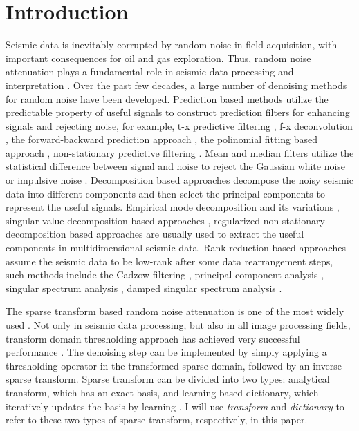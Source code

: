 \section{Introduction}
Seismic data is inevitably corrupted by random noise in field acquisition, with important consequences for oil and gas exploration. Thus, random noise attenuation plays a fundamental role in seismic data processing and interpretation \cite[]{fxydecon,zhuang2015,qushan2015,shuwei2016vscan,huijian20161,huijian20162}. Over the past few decades, a large number of denoising methods for random noise have been developed.  
Prediction based methods utilize the predictable property of useful signals to construct prediction filters for enhancing signals and rejecting noise, for example, t-x predictive filtering \cite[]{abma1995}, f-x deconvolution \cite[]{canales1984}, the forward-backward prediction approach \cite[]{yanghua1999}, the polinomial fitting based approach \cite[]{guochang20112}, non-stationary predictive filtering \cite[]{guochang2012,guochang2013}. Mean and median filters utilize the statistical difference between signal and noise to reject the Gaussian white noise or impulsive noise \cite[]{liuyang2009tvmf,yike2013,shuwei2016}.  Decomposition based approaches decompose the noisy seismic data into different components and then select the principal components to represent the useful signals. Empirical mode decomposition and its variations \cite[]{huangemd}, singular value decomposition based approaches \cite[]{bekara2007,yangkang20141,shuwei2015}, regularized non-stationary decomposition based approaches \cite[]{fomel20132} are usually used to extract the useful components in multidimensional seismic data. Rank-reduction based approaches assume the seismic data to be low-rank after some data rearrangement steps, such methods include the Cadzow filtering \cite[]{trickett2008}, principal component analysis \cite[]{weilin2016seg2}, singular spectrum analysis \cite[]{mssa,weilin2017}, damped  singular spectrum analysis \cite[]{weilin2016,zhangdong2016,yangkang2016irr3d,yangkang2016irr5d}. 

The sparse transform based random noise attenuation is one of the most widely used  \cite[]{zhangchao2015,yangkang2016emd}. Not only in seismic data processing, but also in all image processing fields, transform domain thresholding approach has achieved very successful performance \cite[]{protter2009,jianfeng2013}. The denoising step can be implemented by simply applying a thresholding operator in the transformed sparse domain, followed by an inverse sparse transform.  Sparse transform can be divided into two types:  analytical transform, which has an exact basis, and learning-based dictionary, which iteratively updates the basis by learning \cite[]{yangkang2016dsd}. I will use \emph{transform} and \emph{dictionary} to refer to these two types of sparse transform, respectively, in this paper. 

